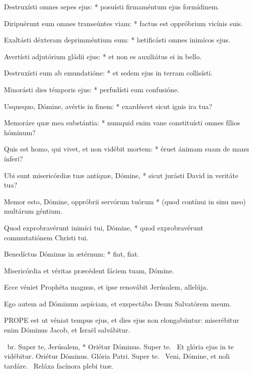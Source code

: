 Destruxísti omnes sepes ejus: * posuísti firmaméntum ejus formídinem.

Diripuérunt eum omnes transeúntes viam: * factus est oppróbrium vicínis suis.

Exaltásti déxteram deprimméntium eum: * lætificásti omnes inimícos ejus.

Avertísti adjutórium gládii ejus: * et non es auxiliátus ei in bello.

Destruxísti eum ab emundatióne: * et sedem ejus in terram collisísti.

Minorásti dies témporis ejus: * perfudísti eum confusióne.

Usquequo, Dómine, avértis in finem: * exardéscet sicut ignis ira tua?

Memoráre quæ mea substántia: * numquid enim vane constituísti omnes fílios hóminum?

Quis est homo, qui vivet, et non vidébit mortem: * éruet ánimam suam de manu ínferi?

Ubi sunt misericórdiæ tuæ antíquæ, Dómine, * sicut jurásti David in veritáte tua?

Memor esto, Dómine, oppróbrii servórum tuórum * (quod contínui in sinu meo) multárum géntium.

Quod exprobravérunt inimíci tui, Dómine, * quod exprobravérunt commutatiónem Christi tui.

Benedíctus Dóminus in ætérnum: * fiat, fiat.

  Misericórdia et véritas præcédent fáciem tuam, Dómine.


  Ecce véniet Prophéta magnus, et ipse renovábit Jerúsalem, allelúja.

  Ego autem ad Dóminum aspíciam, et exspectábo Deum Salvatórem meum.


\lettrine[lines=2]{P}{ROPE} est ut véniat tempus ejus, et dies ejus non elongabúntur: miserébitur enim Dóminus Jacob, et Israël salvábitur.

\R\ br. Super te, Jerúsalem, * Oriétur Dóminus. Super te. \V\ Et glória ejus in te vidébitur. Oriétur Dóminus. Glória Patri. Super te. \V\ Veni, Dómine, et noli tardáre. \R\ Reláxa facínora plebi tuæ.


